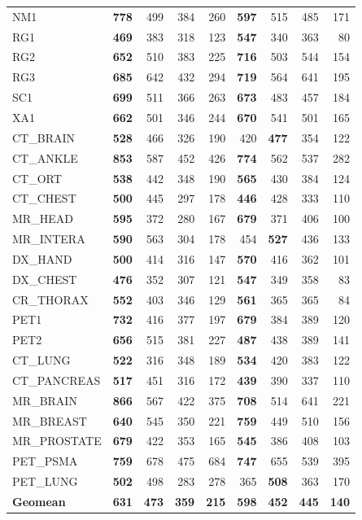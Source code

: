 \documentclass[journal]{IEEEtran}
\begin{document}
\begin{table}[htbp]
\begin{tabular}{l|rrrr|rrrr}
NM1            & \textbf{778} & 499 & 384 & 260 & \textbf{597} & 515 & 485 & 171 \\
RG1            & \textbf{469} & 383 & 318 & 123 & \textbf{547} & 340 & 363 & 80 \\
RG2            & \textbf{652} & 510 & 383 & 225 & \textbf{716} & 503 & 544 & 154 \\
RG3            & \textbf{685} & 642 & 432 & 294 & \textbf{719} & 564 & 641 & 195 \\
SC1            & \textbf{699} & 511 & 366 & 263 & \textbf{673} & 483 & 457 & 184 \\
XA1            & \textbf{662} & 501 & 346 & 244 & \textbf{670} & 541 & 501 & 165 \\
CT\_BRAIN      & \textbf{528} & 466 & 326 & 190 & 420 & \textbf{477} & 354 & 122 \\
CT\_ANKLE      & \textbf{853} & 587 & 452 & 426 & \textbf{774} & 562 & 537 & 282 \\
CT\_ORT        & \textbf{538} & 442 & 348 & 190 & \textbf{565} & 430 & 384 & 124 \\
CT\_CHEST      & \textbf{500} & 445 & 297 & 178 & \textbf{446} & 428 & 333 & 110 \\
MR\_HEAD       & \textbf{595} & 372 & 280 & 167 & \textbf{679} & 371 & 406 & 100 \\
MR\_INTERA     & \textbf{590} & 563 & 304 & 178 & 454 & \textbf{527} & 436 & 133 \\
DX\_HAND       & \textbf{500} & 414 & 316 & 147 & \textbf{570} & 416 & 362 & 101 \\
DX\_CHEST      & \textbf{476} & 352 & 307 & 121 & \textbf{547} & 349 & 358 & 83 \\
CR\_THORAX     & \textbf{552} & 403 & 346 & 129 & \textbf{561} & 365 & 365 & 84 \\
PET1           & \textbf{732} & 416 & 377 & 197 & \textbf{679} & 384 & 389 & 120 \\
PET2           & \textbf{656} & 515 & 381 & 227 & \textbf{487} & 438 & 389 & 141 \\
CT\_LUNG       & \textbf{522} & 316 & 348 & 189 & \textbf{534} & 420 & 383 & 122 \\
CT\_PANCREAS   & \textbf{517} & 451 & 316 & 172 & \textbf{439} & 390 & 337 & 110 \\
MR\_BRAIN      & \textbf{866} & 567 & 422 & 375 & \textbf{708} & 514 & 641 & 221 \\
MR\_BREAST     & \textbf{640} & 545 & 350 & 221 & \textbf{759} & 449 & 510 & 156 \\
MR\_PROSTATE   & \textbf{679} & 422 & 353 & 165 & \textbf{545} & 386 & 408 & 103 \\
PET\_PSMA      & \textbf{759} & 678 & 475 & 684 & \textbf{747} & 655 & 539 & 395 \\
PET\_LUNG      & \textbf{502} & 498 & 283 & 278 & 365 & \textbf{508} & 363 & 170 \\
\midrule
\textbf{Geomean} & \textbf{631} & \textbf{473} & \textbf{359} & \textbf{215} & \textbf{598} & \textbf{452} & \textbf{445} & \textbf{140} \\
\bottomrule
\end{tabular}
\end{table}
\end{document}
